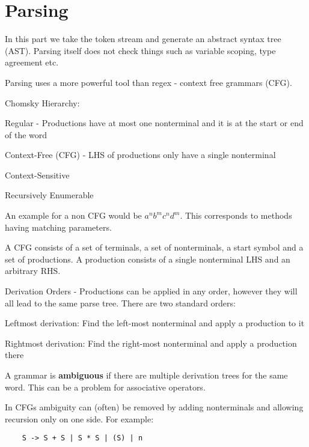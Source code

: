 \section*{Parsing}

In this part we take the token stream and generate an abstract syntax tree (AST). Parsing itself does not check things such as variable scoping, type agreement etc. \medskip

Parsing uses a more powerful tool than regex - context free grammars (CFG). \medskip

Chomsky Hierarchy:
\begin{compactitem}
	\item Regular - Productions have at most one nonterminal and it is at the start or end of the word
	\item Context-Free (CFG) - LHS of productions only have a single nonterminal
	\item Context-Sensitive
	\item Recursively Enumerable
\end{compactitem}

An example for a non CFG would be $a^n b^m c^n d^m$. This corresponds to methods having matching parameters.\medskip

A CFG consists of a set of terminals, a set of nonterminals, a start symbol and a set of productions. A production consists of a single nonterminal LHS and an arbitrary RHS. \medskip

Derivation Orders - Productions can be applied in any order, however they will all lead to the same parse tree. There are two standard orders:
\begin{compactitem}
	\item Leftmost derivation: Find the left-most nonterminal and apply a production to it
	\item Rightmost derivation: Find the right-most nonterminal and apply a production there
\end{compactitem}

A grammar is \textbf{ambiguous} if there are multiple derivation trees for the same word. This can be a problem for associative operators. \medskip

In CFGs ambiguity can (often) be removed by adding nonterminals and allowing recursion only on one side. For example:\smallskip

\begin{lstlisting}
	S -> S + S | S * S | (S) | n
\end{lstlisting} \smallskip


